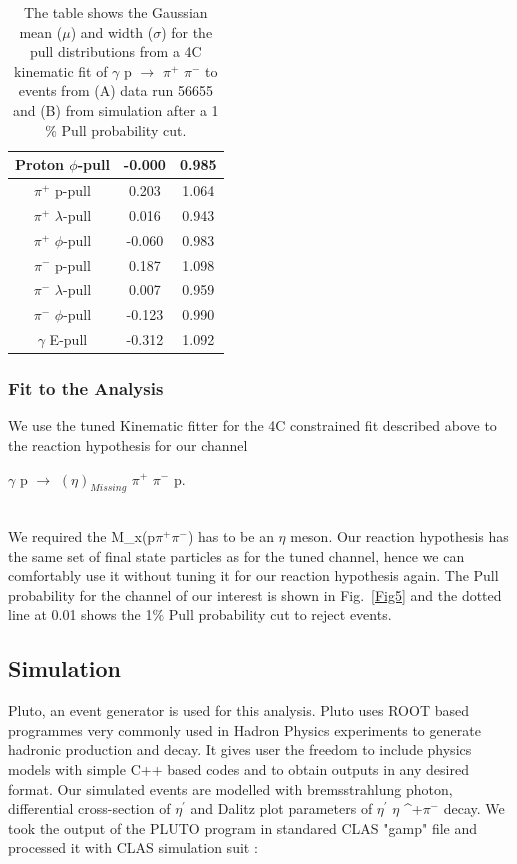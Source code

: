 \documentclass[12pt,a4paper]{amsbook}
\theoremstyle{definition}
\begin{document}
{\begin{table}
\begin{subtable}{.5\textwidth}
\begin{tabular}{ |c|c|c| }
\hline
Proton $\phi$-pull                         & -0.000 & 0.985  \\
\hline
$\pi^{+}$ p-pull        & 0.203  & 1.064  \\
\hline
$\pi^{+}$ $\lambda$-pull & 0.016  & 0.943  \\
\hline
$\pi^{+}$ $\phi$-pull    & -0.060 & 0.983  \\
\hline
$\pi^{-}$ p-pull        & 0.187  & 1.098  \\
\hline
$\pi^{-}$ $\lambda$-pull & 0.007  & 0.959  \\
\hline
$\pi^{-}$ $\phi$-pull    & -0.123 & 0.990  \\
\hline
$\gamma$ E-pull                           & -0.312 & 1.092  \\ 
\hline
\end{tabular}
\end{subtable}%
\caption{The table shows the Gaussian mean ($\mu$) and width ($\sigma$) for the pull distributions from a 4C kinematic fit of  $\gamma$ p $\rightarrow$ $\pi^{+}$ $\pi^{-}$ to events from (A) data run 56655 and (B) from simulation after a 1$\%$ Pull probability cut.} 
\label{tab2}
\end{table}

\subsubsection{Fit to the Analysis}

	We use the tuned Kinematic fitter for the 4C constrained fit described above to the reaction hypothesis for our channel 
\begin{equationarray}
$\gamma$ p $\rightarrow$ $(\eta)_{Missing}$ $\pi^{+}$ $\pi^{-}$ p.
\end{equationarray}\\	
 We required the M_{x}(p$\pi^{+}$$\pi^{-}$) has to be an $\eta$ meson. Our reaction hypothesis has the same set of final state particles as for the tuned channel, hence we can comfortably use it without tuning it for our reaction hypothesis again. The Pull probability for the channel of our interest is shown in Fig.~\ref{Fig5} and the dotted line at 0.01 shows the 1$\%$ Pull probability cut to reject events. 
 
\subsection{Simulation}
Pluto, an event generator is used for this analysis. Pluto uses ROOT based programmes very commonly used in Hadron Physics experiments to generate hadronic production and decay. It gives user the freedom to include physics models with simple C++ based codes and to obtain outputs in any desired format. Our simulated events are modelled with bremsstrahlung photon, differential cross-section of $\eta^{\prime}$ and Dalitz plot parameters of $\eta^{\prime}$ \rightarrow$ \eta$ \pi^{+}$ \pi^{-}$ decay. We took the output of the PLUTO program in standared CLAS "gamp" file and processed it with CLAS simulation suit :

}
\end{document}
